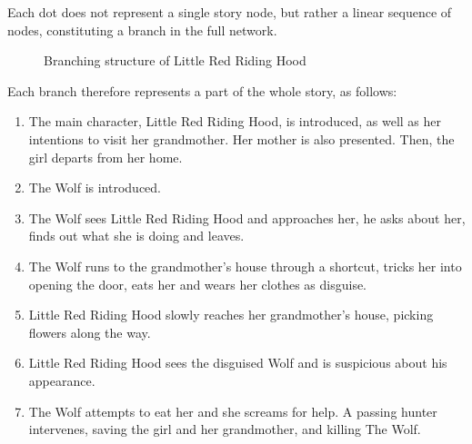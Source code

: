 \documentclass[12pt,a4paper,oneside]{report}
\begin{document}
Each dot does not represent a single story node, but rather a linear sequence of nodes, constituting a branch in the full network.

\begin{figure}[H]
\caption{Branching structure of Little Red Riding Hood}
 \label{fig:littlered}

\bigskip

\bigskip
 
 \centering
{}
\end{figure}

Each branch therefore represents a part of the whole story, as follows:

\begin{enumerate}\setlength{\itemsep}{0pt}
\item The main character, Little Red Riding Hood, is introduced, as well as her intentions to visit her grandmother. Her mother is also presented. Then, the girl departs from her home.
\item The Wolf is introduced.
\item The Wolf sees Little Red Riding Hood and approaches her, he asks about her, finds out what she is doing and leaves.
\item The Wolf runs to the grandmother's house through a shortcut, tricks her into opening the door, eats her and wears her clothes as disguise.
\item Little Red Riding Hood slowly reaches her grandmother's house, picking flowers along the way. 
\item Little Red Riding Hood sees the disguised Wolf and is suspicious about his appearance.
\item The Wolf attempts to eat her and she screams for help. A passing hunter intervenes, saving the girl and her grandmother, and killing The Wolf.
\end{enumerate}
\end{document}
